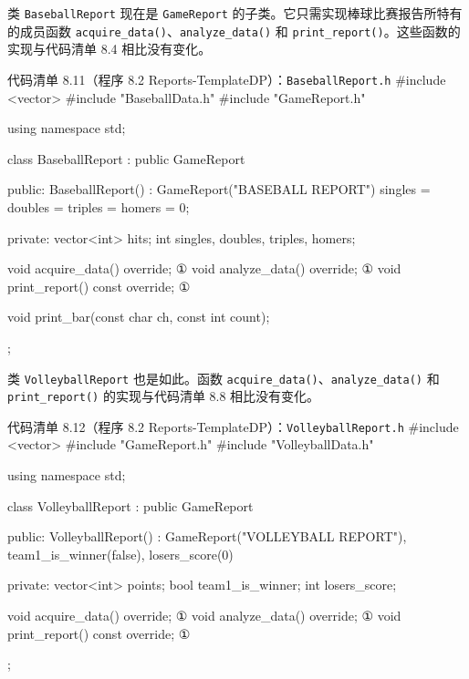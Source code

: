 类 \texttt{Baseball\allowbreak{}Report} 现在是 \texttt{Game\allowbreak{}Report} 的子类。它只需实现棒球比赛报告所特有的成员函数 \texttt{acquire\_\allowbreak{}data(\allowbreak{})\allowbreak{}}、\texttt{analyze\_\allowbreak{}data(\allowbreak{})\allowbreak{}} 和 \texttt{print\_\allowbreak{}report(\allowbreak{})\allowbreak{}}。这些函数的实现与代码清单 8.4 相比没有变化。

\begin{codeboxt}{代码清单 8.11（程序 8.2 Reports-TemplateDP）：\texttt{Baseball\allowbreak{}Report.\allowbreak{}h}}
#include <vector>
#include "BaseballData.h"
#include "GameReport.h"

using namespace std;

class BaseballReport : public GameReport
{
public:
    BaseballReport() : GameReport("BASEBALL REPORT")
    {
        singles = doubles = triples = homers = 0;
    }

private:
    vector<int> hits;
    int singles, doubles, triples, homers;

    void acquire_data() override;       ①
    void analyze_data() override;       ①
    void print_report() const override; ①

    void print_bar(const char ch, const int count);
};
\end{codeboxt}
\par

类 \texttt{Volleyball\allowbreak{}Report} 也是如此。函数 \texttt{acquire\_\allowbreak{}data(\allowbreak{})\allowbreak{}}、\texttt{analyze\_\allowbreak{}data(\allowbreak{})\allowbreak{}} 和 \texttt{print\_\allowbreak{}report(\allowbreak{})\allowbreak{}} 的实现与代码清单 8.8 相比没有变化。

\begin{codeboxt}{代码清单 8.12（程序 8.2 Reports-TemplateDP）：\texttt{Volleyball\allowbreak{}Report.\allowbreak{}h}}
#include <vector>
#include "GameReport.h"
#include "VolleyballData.h"

using namespace std;

class VolleyballReport : public GameReport
{

public:
    VolleyballReport()
        : GameReport("VOLLEYBALL REPORT"),
          team1_is_winner(false), losers_score(0) {}

private:
    vector<int> points;
    bool team1_is_winner;
    int  losers_score;

    void acquire_data() override;       ①
    void analyze_data() override;       ①
    void print_report() const override; ①
};
\end{codeboxt}
\par

